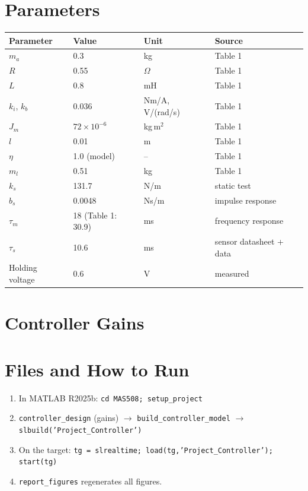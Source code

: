 \appendix
\renewcommand{\thesection}{\Alph{section}}
\setcounter{section}{0}
\section{Parameters}
\begin{table}[H]\centering
\begin{tabular}{llll}\toprule
Parameter & Value & Unit & Source\\\midrule
$m_a$ & 0.3 & kg & Table 1\\
$R$ & 0.55 & $\Omega$ & Table 1\\
$L$ & 0.8 & mH & Table 1\\
$k_i$, $k_b$ & 0.036 & Nm/A, V/(rad/s) & Table 1\\
$J_m$ & $72\times10^{-6}$ & kg\,m$^2$ & Table 1\\
$l$ & 0.01 & m & Table 1\\
$\eta$ & 1.0 (model) & -- & Table 1\\
$m_l$ & 0.51 & kg & Table 1\\
$k_s$ & 131.7 & N/m & static test\\
$b_s$ & 0.0048 & Ns/m & impulse response\\
$\tau_m$ & 18 (Table 1: 30.9) & ms & frequency response\\
$\tau_s$ & 10.6 & ms & sensor datasheet + data\\
Holding voltage & 0.6 & V & measured\\\bottomrule
\end{tabular}\end{table}

\section{Controller Gains}


\section{Files and How to Run}
\begin{enumerate}
\item In MATLAB R2025b: \texttt{cd MAS508; setup\_project}
\item \texttt{controller\_design} (gains) $\to$ \texttt{build\_controller\_model} $\to$ \texttt{slbuild('Project\_Controller')}
\item On the target: \texttt{tg = slrealtime; load(tg,'Project\_Controller'); start(tg)}
\item \texttt{report\_figures} regenerates all figures.
\end{enumerate}
